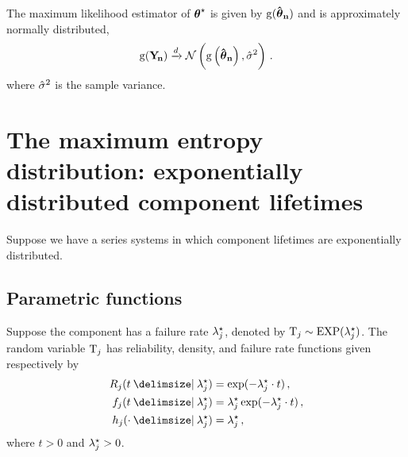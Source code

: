 \documentclass[
    11pt,
    extrafontsizes,
    article,
    oldfontcommands,
    final,
    oneside,
    openany,
    hidelinks]{memoir}
\begin{document}
The maximum likelihood estimator of ${\boldsymbol{\mathbf{\theta}}}^{\star}$ is given by $\operatorname{g}(\boldsymbol{\mathbf{\hat{\boldsymbol{\mathbf{\theta}}}_{n}}})$ and is approximately normally distributed,
\begin{equation}
\operatorname{g}(\mathrm{\boldsymbol{\mathbf{Y_{\!n}}}}) \xrightarrow{d} \mathcal{N}\left(\operatorname{g}\left(\boldsymbol{\mathbf{\hat{\boldsymbol{\mathbf{\theta}}}_{n}}}\right), \hat{\sigma}^2\right)\,.
\end{equation}
where $\hat{\sigma}^2$ is the sample variance.

\chapter{The maximum entropy distribution: exponentially distributed component lifetimes}
\label{sec:common_distributions}
Suppose we have a series systems in which component lifetimes are exponentially 
distributed.

\section{Parametric functions}
Suppose the \jth component has a failure rate ${\lambda}^{\star}_j$, denoted by 
$\mathrm{T}_j \sim \text{EXP}({\lambda}^{\star}_j)$. The random variable $\mathrm{T}_j$ has 
reliability, density, and failure rate functions given respectively by
\begin{align}
    \label{eq:expo_reliability}
    \srv_j(t \Given \tparam\lambda_j) &=
        \exp(-\tparam\lambda_j \cdot t)\,,\\
    \label{eq:expo_pdf}
    \pdf_j(t \Given \tparam\lambda_j) &=
        \tparam\lambda_j \exp(-\tparam\lambda_j \cdot t)\,,\\
    \label{eq:expo_haz}
    \haz_j(\cdot \Given \tparam\lambda_j) &=
        \tparam{\lambda}_j\,,
\end{align}
where $t > 0$ and ${\lambda}^{\star}_j > 0$.
\end{document}
